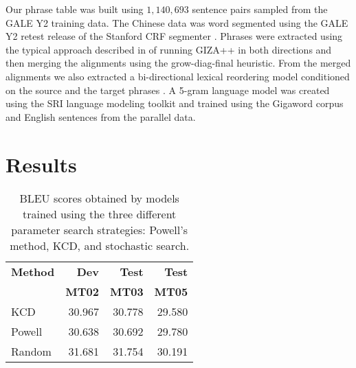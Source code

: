 \documentclass[11pt,tightenlines,kern-1pt]{article}
\begin{document}
Our phrase table was built using \mbox{$1,140,693$} sentence pairs sampled from the GALE Y2 training data.  The Chinese data was word segmented using the GALE Y2 retest release of the Stanford CRF segmenter \cite{tseng05}.  Phrases were extracted using the typical approach described in  of running GIZA++ \cite{och03} in both directions and then merging the alignments using the grow-diag-final heuristic. From the merged alignments we also extracted a bi-directional lexical reordering model conditioned on the source and the target phrases \cite{tillmann04} \cite{koehn2007}. A 5-gram language model was created using the SRI language modeling toolkit \cite{stolcke02srilm} and trained using the Gigaword corpus and English sentences from the parallel data. 


  


\section{Results}

\begin{table}
\begin{center}
\begin{tabular}{|l|rrr|}
\hline \bf Method  & \bf Dev  & \bf Test & \bf Test \\ 
                   & \bf MT02 & \bf MT03 & \bf MT05 \\ \hline
KCD        & 30.967 & 30.778 & 29.580 \\
Powell     & 30.638 & 30.692 & 29.780  \\
Random     & 31.681 & 31.754 & 30.191 \\
\hline
\end{tabular}
\end{center}
\caption{
\label{searchstrat}
BLEU scores obtained by models trained using the three different parameter search strategies: Powell's method, KCD, and stochastic search.}
\end{table}
\end{document}
